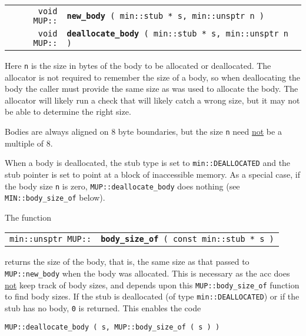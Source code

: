 \documentclass[12pt]{article}
\makeatletter
\newcommand{\ttindex}[1]{\index{#1@{\tt #1}}}
\newcommand{\MUPindex}[1]{\ttindex{MUP::#1}\ttindex{#1}}
\newcommand{\EOL}{\penalty \exhyphenpenalty}
\newenvironment{indpar}[1][0.3in]%
	{\begin{list}{}%
		     {\setlength{\itemsep}{0in}%
		      \setlength{\topsep}{0in}%
		      \setlength{\parsep}{1ex}%
		      \setlength{\labelwidth}{#1}%
		      \setlength{\leftmargin}{#1}%
		      \addtolength{\leftmargin}{\labelsep}}%
	 \item}%
	{\end{list}}
\newcommand{\LABEL}[1]{\label{#1}}
\newcommand{\MUPKEY}[1]{{\tt \bf #1}\MUPindex{#1}}
\makeatother
\begin{document}
\begin{indpar}\begin{tabular}{@{}r@{}l@{}}
\verb|void MUP::|
    & \MUPKEY{new\_body}\verb| ( min::stub * s, min::unsptr n )|
\LABEL{MUP::NEW_BODY} \\
\verb|void MUP::|
    & \MUPKEY{deallocate\_body}\verb| ( min::stub * s, min::unsptr n )|
\LABEL{MUP::DEALLOCATE_BODY} \\
\end{tabular}\end{indpar}

Here \verb|n| is the size in bytes of the body to be allocated or deallocated.
The allocator is not required to remember the size of a body,
so when deallocating the body the caller must provide the same size
as was used to allocate the body.  The allocator will likely
run a check that will likely catch a wrong size, but it may not
be able to determine the right size.

Bodies are always aligned on 8 byte boundaries, but the size \verb|n|
need \underline{not} be a multiple of 8.

When a body is deallocated, the stub type is set to
\verb|min::DEALLOCATED| and the stub pointer is set to
point at a block of inaccessible memory.
As a special case, if the body size \verb|n| is zero,
{\tt MUP::\EOL deallocate\_\EOL body} does nothing
(see {\tt MIN::\EOL body\_\EOL size\_\EOL of} below).


The function

\begin{indpar}\begin{tabular}{@{}r@{}l@{}}
\verb|min::unsptr MUP::|
    & \MUPKEY{body\_size\_of}\verb| ( const min::stub * s )|
\LABEL{MUP::BODY_SIZE_OF} \\
\end{tabular}\end{indpar}

returns the size of the body, that is, the same size
as that passed to {\tt MUP::new\_\EOL body} when the
body was allocated.  This is necessary as the acc does
\underline{not} keep track of body sizes, and depends upon
this {\tt MUP::body\_\EOL size\_\EOL of} function to
find body sizes.  If the stub is deallocated (of type
\verb|min::DEALLOCATED|) or if the stub has no body,
\verb|0| is returned.  This enables the code
\begin{center}
\verb|MUP::deallocate_body ( s, MUP::body_size_of ( s ) )|
\end{center}
\end{document}
